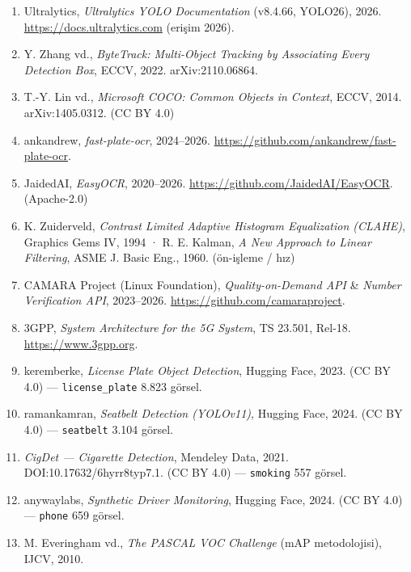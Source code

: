 \documentclass[12pt,a4paper]{article}
\newcommand{\tcode}[1]{\texttt{\small #1}}
\begin{document}
\begin{enumerate}\setlength{\itemsep}{0pt}\setlength{\parskip}{0pt}
\item Ultralytics, \textit{Ultralytics YOLO Documentation} (v8.4.66, YOLO26), 2026. \url{https://docs.ultralytics.com} (erişim 2026).
\item Y. Zhang vd., \textit{ByteTrack: Multi-Object Tracking by Associating Every Detection Box}, ECCV, 2022. arXiv:2110.06864.
\item T.-Y. Lin vd., \textit{Microsoft COCO: Common Objects in Context}, ECCV, 2014. arXiv:1405.0312. (CC BY 4.0)
\item ankandrew, \textit{fast-plate-ocr}, 2024--2026. \url{https://github.com/ankandrew/fast-plate-ocr}.
\item JaidedAI, \textit{EasyOCR}, 2020--2026. \url{https://github.com/JaidedAI/EasyOCR}. (Apache-2.0)
\item K. Zuiderveld, \textit{Contrast Limited Adaptive Histogram Equalization (CLAHE)}, Graphics Gems IV, 1994 · R. E. Kalman, \textit{A New Approach to Linear Filtering}, ASME J. Basic Eng., 1960. (ön-işleme / hız)
\item CAMARA Project (Linux Foundation), \textit{Quality-on-Demand API} \& \textit{Number Verification API}, 2023--2026. \url{https://github.com/camaraproject}.
\item 3GPP, \textit{System Architecture for the 5G System}, TS 23.501, Rel-18. \url{https://www.3gpp.org}.
\item keremberke, \textit{License Plate Object Detection}, Hugging Face, 2023. (CC BY 4.0) --- \tcode{license\_plate} 8.823 görsel.
\item ramankamran, \textit{Seatbelt Detection (YOLOv11)}, Hugging Face, 2024. (CC BY 4.0) --- \tcode{seatbelt} 3.104 görsel.
\item \textit{CigDet — Cigarette Detection}, Mendeley Data, 2021. DOI:10.17632/6hyrr8typ7.1. (CC BY 4.0) --- \tcode{smoking} 557 görsel.
\item anywaylabs, \textit{Synthetic Driver Monitoring}, Hugging Face, 2024. (CC BY 4.0) --- \tcode{phone} 659 görsel.
\item M. Everingham vd., \textit{The PASCAL VOC Challenge} (mAP metodolojisi), IJCV, 2010.
\end{enumerate}
\normalsize
\end{document}
